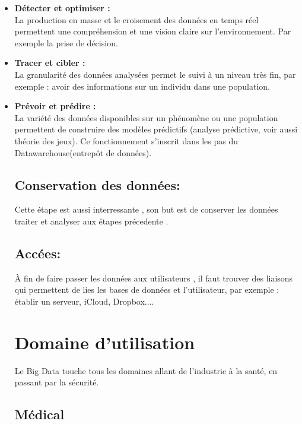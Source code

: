 \documentclass[11pt,twoside,openany,x11names,svgnames]{memoir}
\begin{document}
			\begin{itemize}
	\item \textbf{Détecter et optimiser :} \\
				La production en masse et le croisement des données en temps réel permettent une compréhension et une vision claire sur l’environnement. Par exemple la prise de décision.
	\item \textbf{Tracer et cibler :} \\
				La granularité des données analysées permet le suivi à un niveau très fin, par exemple : avoir des informations sur un individu dans une population.
	\item \textbf{Prévoir et prédire :} \\
	La variété des données disponibles sur un phénomène ou une population permettent de construire des modèles prédictifs (analyse prédictive, voir aussi théorie des jeux). Ce fonctionnement s’inscrit dans les pas du Datawarehouse(entrepôt de données).
	 
		
		\section{Conservation des donn\'ees:}
		 Cette étape est aussi interressante , son but est de conserver les donn\'ees traiter et analyser aux étapes précedente .
		 
		
		
		\section{Acc\'ees:}
		 \`A fin de faire passer les données aux utilisateurs , il faut trouver des liaisons qui permettent de lies les bases de donn\'ees et l'utilisateur, par exemple : établir un serveur, iCloud, Dropbox....
		
\chapter{Domaine d'utilisation}
Le Big Data touche tous les domaines allant de l’industrie à la santé, en passant par la sécurité.
	\section{Médical}
			

\end{itemize}
\end{document}
